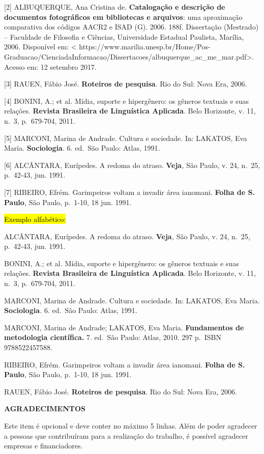 \documentclass[
]{article}
\begin{document}
{[}2{]} ALBUQUERQUE, Ana Cristina de. \textbf{Catalogação e descrição de
documentos fotográficos em bibliotecas e arquivos}: uma aproximação
comparativa dos códigos AACR2 e ISAD (G). 2006. 188f. Dissertação
(Mestrado) -- Faculdade de Filosofia e Ciências, Universidade Estadual
Paulista, Marília, 2006. Disponível em: \textless{}
https://www.marilia.unesp.br/Home/Pos-Graduacao/CienciadaInformacao/Dissertacoes/albuquerque\_ac\_me\_mar.pdf\textgreater.
Acesso em: 12 setembro 2017.

{[}3{]} RAUEN, Fábio José. \textbf{Roteiros de pesquisa}. Rio do Sul:
Nova Era, 2006.

{[}4{]} BONINI, A.; et al\emph{.} Mídia, suporte e hipergênero: os
gêneros textuais e suas relações. \textbf{Revista Brasileira de
Linguística Aplicada}. Belo Horizonte, v. 11, n.~3, p.~679-704, 2011.

{[}5{]} MARCONI, Marina de Andrade. Cultura e sociedade. In: LAKATOS,
Eva Maria. \textbf{Sociologia}\emph{.} 6. ed.~São Paulo: Atlas, 1991.

{[}6{]} ALCÂNTARA, Eurípedes. A redoma do atraso. \textbf{Veja}\emph{,}
São Paulo, v. 24, n.~25, p.~42-43, jun. 1991.

{[}7{]} RIBEIRO, Efrém. Garimpeiros voltam a invadir área ianomani.
\textbf{Folha de S. Paulo}\emph{,} São Paulo, p.~1-10, 18 jun. 1991.

\hl{Exemplo alfabético:}

ALCÂNTARA, Eurípedes. A redoma do atraso. \textbf{Veja}\emph{,} São
Paulo, v. 24, n.~25, p.~42-43, jun. 1991.

BONINI, A.; et al\emph{.} Mídia, suporte e hipergênero: os gêneros
textuais e suas relações. \textbf{Revista Brasileira de Linguística
Aplicada}. Belo Horizonte, v. 11, n.~3, p.~679-704, 2011.

MARCONI, Marina de Andrade. Cultura e sociedade. In: LAKATOS, Eva Maria.
\textbf{Sociologia}\emph{.} 6. ed.~São Paulo: Atlas, 1991.

MARCONI, Marina de Andrade; LAKATOS, Eva Maria. \textbf{Fundamentos de
metodologia científica. }7. ed.~São Paulo: Atlas, 2010. 297 p.~ISBN
9788522457588.

RIBEIRO, Efrém. Garimpeiros voltam a invadir área ianomani.
\textbf{Folha de S. Paulo}\emph{,} São Paulo, p.~1-10, 18 jun. 1991.

RAUEN, Fábio José. \textbf{Roteiros de pesquisa}. Rio do Sul: Nova Era,
2006.

\textbf{AGRADECIMENTOS}

Este item é opcional e deve conter no máximo 5 linhas. Além de poder
agradecer a pessoas que contribuíram para a realização do trabalho, é
possível agradecer empresas e financiadores.
\end{document}

